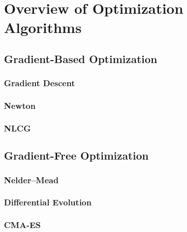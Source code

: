 \section{Overview of Optimization Algorithms}


\subsection{Gradient-Based Optimization}


\subsubsection{Gradient Descent}


\subsubsection{Newton}


\subsubsection{NLCG}


\subsection{Gradient-Free Optimization}


\subsubsection{Nelder--Mead}


\subsubsection{Differential Evolution}


\subsubsection{CMA-ES}

